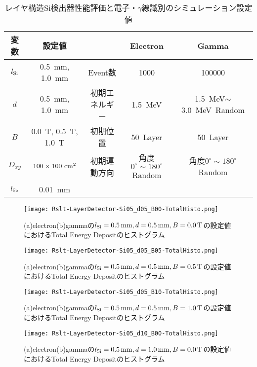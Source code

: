 \documentclass[a4paper,10pt]{jreport}
\begin{document}
\begin{table}[H] 
	\center
	\caption{レイヤ構造Si検出器性能評価と電子・$\gamma$線識別のシミュレーション設定値} \label{Tab-LayerDetectorDpendence}
	\begin{tabular}{|cc||c|cc|}
		\hline
		変数 & 設定値 & & Electron & Gamma\\
		\hline
		$l_{\rm{Si}}$ &  \SI{0.5}{mm}, \SI{1.0}{mm} &Event数 & 1000 & 100000 \\ 
		$d$ & \SI{0.5}{mm}, \SI{1.0}{mm} & 初期エネルギー &
		 \SI{1.5}{MeV} & \SI{1.5}{MeV}$\sim$\SI{3.0}{MeV}\ Random \\
		$B$ & \SI{0.0}{T}, \SI{0.5}{T}, \SI{1.0}{T} & 初期位置 & \SI{50}{Layer} & \SI{50}{Layer} \\
		$D_{xy}$ & $100\times100\ \rm{cm}^2$ & 初期運動方向 & 
		角度$0^{\circ}\sim180^{\circ}$Random & 角度$0^{\circ}\sim180^{\circ}$Random \\
		$l_{\rm{Se}}$ & \SI{0.01}{mm} & & & \\
		\hline
	\end{tabular}
\end{table}

\begin{figure}[H]
	\center
	\texttt{[image: Rslt-LayerDetector-Si05\_d05\_B00-TotalHisto.png]}
	\caption{(a)electron(b)gammaの$l_{\rm{Si}}=\SI{0.5}{mm}, d=\SI{0.5}{mm}, B=\SI{0.0}{T}$の設定値におけるTotal Energy Depositのヒストグラム}
	\label{Rslt-LayerDetector-Si05_d05_B00-TotalHisto}
\end{figure}

\begin{figure}[H]
	\center
	\texttt{[image: Rslt-LayerDetector-Si05\_d05\_B05-TotalHisto.png]}
	\caption{(a)electron(b)gammaの$l_{\rm{Si}}=\SI{0.5}{mm}, d=\SI{0.5}{mm}, B=\SI{0.5}{T}$の設定値におけるTotal Energy Depositのヒストグラム}
	\label{Rslt-LayerDetector-Si05_d05_B05-TotalHisto}
\end{figure}

\begin{figure}[H]
	\center
	\texttt{[image: Rslt-LayerDetector-Si05\_d05\_B10-TotalHisto.png]}
	\caption{(a)electron(b)gammaの$l_{\rm{Si}}=\SI{0.5}{mm}, d=\SI{0.5}{mm}, B=\SI{1.0}{T}$の設定値におけるTotal Energy Depositのヒストグラム}
	\label{Rslt-LayerDetector-Si05_d05_B10-TotalHisto}
\end{figure}

\begin{figure}[H]
	\center
	\texttt{[image: Rslt-LayerDetector-Si05\_d10\_B00-TotalHisto.png]}
	\caption{(a)electron(b)gammaの$l_{\rm{Si}}=\SI{0.5}{mm}, d=\SI{1.0}{mm}, B=\SI{0.0}{T}$の設定値におけるTotal Energy Depositのヒストグラム}
	\label{Rslt-LayerDetector-Si05_d10_B00-TotalHisto}
\end{figure}
\end{document}
